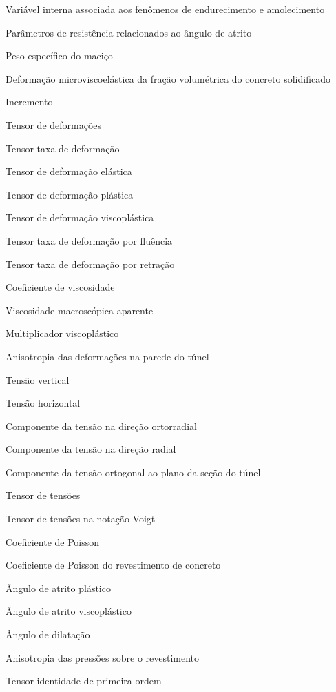 \item[$\alpha$]							Variável interna associada aos fenômenos de endurecimento e amolecimento
\item[$\beta_1$, $\beta_2$]				Parâmetros de resistência relacionados ao ângulo de atrito
\item[$\gamma_m$]						Peso específico do maciço
\item[$\gamma(t-t_0)$]					Deformação microviscoelástica da fração volumétrica do concreto solidificado
\item[$\Delta$]							Incremento
\item[$\varepsilonll$]					Tensor de deformações
\item[$\dot \varepsilonll$]				Tensor taxa de deformação
\item[$\varepsilonll^{e}$]				Tensor de deformação elástica
\item[$\varepsilonll^{p}$]				Tensor de deformação plástica
\item[$\varepsilonll^{vp}$]				Tensor de deformação viscoplástica
\item[$\dot \varepsilonll^{cr}$]		Tensor taxa de deformação por fluência
\item[$\dot \varepsilonll^{sh}$]		Tensor taxa de deformação por retração
\item[$\eta$]							Coeficiente de viscosidade %
\item[$\eta(t)$]						Viscosidade macroscópica aparente
\item[$\dot \lambda^{vp}$]				Multiplicador viscoplástico
\item[$\rho(\theta)$]					Anisotropia das deformações na parede do túnel
\item[$\sigma_v$]						Tensão vertical
\item[$\sigma_h$]						Tensão horizontal
\item[$ \sigma_{\theta\theta}$]			Componente da tensão na direção ortorradial
\item[$\sigma_{rr}$]					Componente da tensão na direção radial
\item[$\sigma_{zz}$]					Componente da tensão ortogonal ao plano da seção do túnel
\item[$\sigmall$]						Tensor de tensões
\item[$\underline\sigma$]				Tensor de tensões na notação Voigt
\item[$ \nu$]							Coeficiente de Poisson 
\item[$ \nu_c$]							Coeficiente de Poisson do revestimento de concreto
\item[$\phi$]							Ângulo de atrito plástico
\item[$\phi^{vp}$]						Ângulo de atrito viscoplástico
\item[$\psi$]							Ângulo de dilatação
\item[$\chi(\theta)$]					Anisotropia das pressões sobre o revestimento
\item[$\Umll$]							Tensor identidade de primeira ordem



